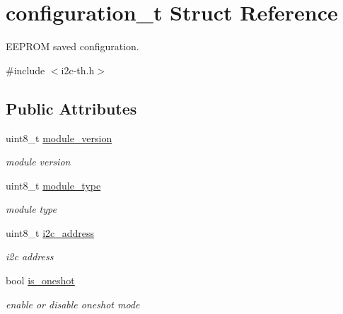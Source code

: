 \hypertarget{structconfiguration__t}{}\section{configuration\+\_\+t Struct Reference}
\label{structconfiguration__t}


E\+E\+P\+R\+OM saved configuration.  




{\ttfamily \#include $<$i2c-\/th.\+h$>$}

\subsection*{Public Attributes}
\begin{DoxyCompactItemize}
\item 
\mbox{\label{structconfiguration__t_a32d4c4bb78b5b231704c8a9f8d1b9e87}} 
uint8\+\_\+t \hyperlink{structconfiguration__t_a32d4c4bb78b5b231704c8a9f8d1b9e87}{module\+\_\+version}
\begin{DoxyCompactList}\small\item\em module version \end{DoxyCompactList}\item 
\mbox{\label{structconfiguration__t_a7dab895a0a9aa44bb65d90ef8016127d}} 
uint8\+\_\+t \hyperlink{structconfiguration__t_a7dab895a0a9aa44bb65d90ef8016127d}{module\+\_\+type}
\begin{DoxyCompactList}\small\item\em module type \end{DoxyCompactList}\item 
\mbox{\label{structconfiguration__t_a0e088540266e347426ae73aed159f63a}} 
uint8\+\_\+t \hyperlink{structconfiguration__t_a0e088540266e347426ae73aed159f63a}{i2c\+\_\+address}
\begin{DoxyCompactList}\small\item\em i2c address \end{DoxyCompactList}\item 
\mbox{\label{structconfiguration__t_a227ef462f171f25e31cb3b0ce70b2597}} 
bool \hyperlink{structconfiguration__t_a227ef462f171f25e31cb3b0ce70b2597}{is\+\_\+oneshot}
\begin{DoxyCompactList}\small\item\em enable or disable oneshot mode \end{DoxyCompactList}\item 

\end{DoxyCompactItemize}
